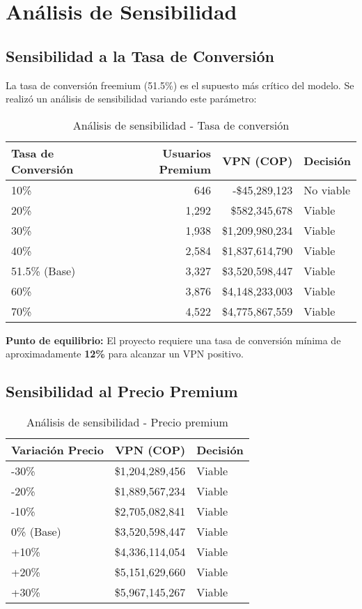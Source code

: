 \section{Análisis de Sensibilidad}

\subsection{Sensibilidad a la Tasa de Conversión}

La tasa de conversión freemium (51.5\%) es el supuesto más crítico del modelo. Se realizó un análisis de sensibilidad variando este parámetro:

\begin{table}[H]
\centering
\begin{tabular}{lrrl}
\toprule
\textbf{Tasa de Conversión} & \textbf{Usuarios Premium} & \textbf{VPN (COP)} & \textbf{Decisión} \\
\midrule
10\% & 646 & -\$45,289,123 & No viable \\
20\% & 1,292 & \$582,345,678 & Viable \\
30\% & 1,938 & \$1,209,980,234 & Viable \\
40\% & 2,584 & \$1,837,614,790 & Viable \\
51.5\% (Base) & 3,327 & \$3,520,598,447 & Viable \\
60\% & 3,876 & \$4,148,233,003 & Viable \\
70\% & 4,522 & \$4,775,867,559 & Viable \\
\bottomrule
\end{tabular}
\caption{Análisis de sensibilidad - Tasa de conversión}
\end{table}

\textbf{Punto de equilibrio:} El proyecto requiere una tasa de conversión mínima de aproximadamente \textbf{12\%} para alcanzar un VPN positivo.

\subsection{Sensibilidad al Precio Premium}

\begin{table}[H]
\centering
\begin{tabular}{lrl}
\toprule
\textbf{Variación Precio} & \textbf{VPN (COP)} & \textbf{Decisión} \\
\midrule
-30\% & \$1,204,289,456 & Viable \\
-20\% & \$1,889,567,234 & Viable \\
-10\% & \$2,705,082,841 & Viable \\
0\% (Base) & \$3,520,598,447 & Viable \\
+10\% & \$4,336,114,054 & Viable \\
+20\% & \$5,151,629,660 & Viable \\
+30\% & \$5,967,145,267 & Viable \\
\bottomrule
\end{tabular}
\caption{Análisis de sensibilidad - Precio premium}
\end{table}

